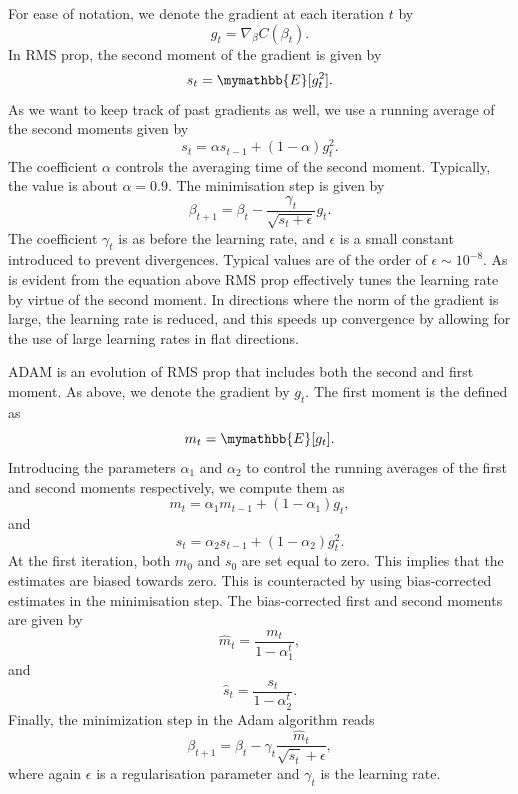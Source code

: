 \documentclass[a4paper, 
amsfonts, 
amssymb, 
amsmath, 
reprint, 
showkeys, 
nofootinbib, 
twoside]{revtex4-2}
\begin{document}
For ease of notation, we denote the gradient at each iteration $t$ by
\begin{equation}
    g_t = \nabla_{\beta}C(\beta_t).
\end{equation}
In RMS prop, the second moment of the gradient is given by 
\begin{equation}
    s_t = \mymathbb{E}[g_t^2].
\end{equation}
As we want to keep track of past gradients as well, we use a running average of the second moments given by
\begin{equation}
    s_{t} = \alpha s_{t - 1} + (1- \alpha)g_t^2.
\end{equation}
The coefficient $\alpha$ controls the averaging time of the second moment. Typically, the value is about $\alpha = 0.9$. The minimisation step is given by
\begin{equation}
    \beta_{t+1} = \beta_t -  \frac{\gamma_t}{\sqrt{s_t + \epsilon}} g_t.
\end{equation}
The coefficient $\gamma_t$ is as before the learning rate, and $\epsilon$ is a small constant introduced to prevent divergences. Typical values are of the order of $\epsilon \sim 10^{-8}$. As is evident from the equation above RMS prop effectively tunes the learning rate by virtue of the second moment. In directions where the norm of the gradient is large, the learning rate is reduced, and this speeds up convergence by allowing for the use of large learning rates in flat directions. 

ADAM is an evolution of RMS prop that includes both the second and first moment. As above, we denote the gradient by $g_t$. The first moment is the defined as
\begin{equation}
    m_t =\mymathbb{E}[g_t].
\end{equation}
Introducing the parameters $\alpha_1$ and $\alpha_2$ to control the running averages of the first and second moments respectively, we compute them as
\begin{equation}
    m_{t} = \alpha_1 m_{t - 1} + (1- \alpha_1)g_t,
\end{equation}
and
\begin{equation}
    s_{t} = \alpha_2 s_{t - 1} + (1- \alpha_2)g_t^2.
\end{equation}
At the first iteration, both $m_0$ and $s_0$ are set equal to zero. This implies that the estimates are biased towards zero. This is counteracted by using bias-corrected estimates in the minimisation step. The bias-corrected first and second moments are given by
\begin{equation}
    \hat{m}_t = \frac{m_t}{1 - \alpha_1^t},
\end{equation} 
and
\begin{equation}
    \hat{s}_t = \frac{s_t}{1 - \alpha_2^t}.
\end{equation}
Finally, the minimization step in the Adam algorithm reads
\begin{equation}
    \beta_{t+1} =  \beta_t - \gamma_t \frac{\hat{m}_t}{\sqrt{\hat{s}_t} + \epsilon},
\end{equation}
where again $\epsilon$ is a regularisation parameter and $\gamma_t$ is the learning rate. 
\end{document}
